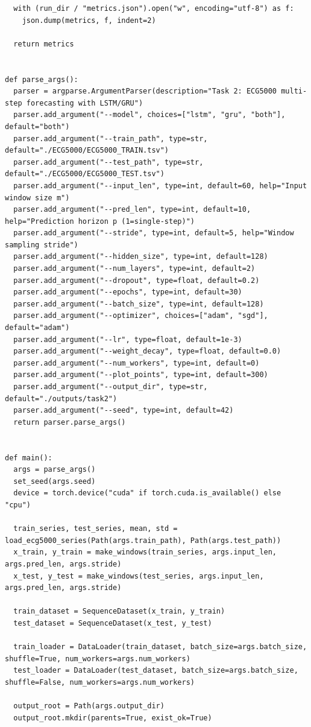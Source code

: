 \documentclass[12pt,a4paper]{ctexart}
\begin{document}
\begin{lstlisting}
  with (run_dir / "metrics.json").open("w", encoding="utf-8") as f:
    json.dump(metrics, f, indent=2)

  return metrics


def parse_args():
  parser = argparse.ArgumentParser(description="Task 2: ECG5000 multi-step forecasting with LSTM/GRU")
  parser.add_argument("--model", choices=["lstm", "gru", "both"], default="both")
  parser.add_argument("--train_path", type=str, default="./ECG5000/ECG5000_TRAIN.tsv")
  parser.add_argument("--test_path", type=str, default="./ECG5000/ECG5000_TEST.tsv")
  parser.add_argument("--input_len", type=int, default=60, help="Input window size m")
  parser.add_argument("--pred_len", type=int, default=10, help="Prediction horizon p (1=single-step)")
  parser.add_argument("--stride", type=int, default=5, help="Window sampling stride")
  parser.add_argument("--hidden_size", type=int, default=128)
  parser.add_argument("--num_layers", type=int, default=2)
  parser.add_argument("--dropout", type=float, default=0.2)
  parser.add_argument("--epochs", type=int, default=30)
  parser.add_argument("--batch_size", type=int, default=128)
  parser.add_argument("--optimizer", choices=["adam", "sgd"], default="adam")
  parser.add_argument("--lr", type=float, default=1e-3)
  parser.add_argument("--weight_decay", type=float, default=0.0)
  parser.add_argument("--num_workers", type=int, default=0)
  parser.add_argument("--plot_points", type=int, default=300)
  parser.add_argument("--output_dir", type=str, default="./outputs/task2")
  parser.add_argument("--seed", type=int, default=42)
  return parser.parse_args()


def main():
  args = parse_args()
  set_seed(args.seed)
  device = torch.device("cuda" if torch.cuda.is_available() else "cpu")

  train_series, test_series, mean, std = load_ecg5000_series(Path(args.train_path), Path(args.test_path))
  x_train, y_train = make_windows(train_series, args.input_len, args.pred_len, args.stride)
  x_test, y_test = make_windows(test_series, args.input_len, args.pred_len, args.stride)

  train_dataset = SequenceDataset(x_train, y_train)
  test_dataset = SequenceDataset(x_test, y_test)

  train_loader = DataLoader(train_dataset, batch_size=args.batch_size, shuffle=True, num_workers=args.num_workers)
  test_loader = DataLoader(test_dataset, batch_size=args.batch_size, shuffle=False, num_workers=args.num_workers)

  output_root = Path(args.output_dir)
  output_root.mkdir(parents=True, exist_ok=True)


\end{lstlisting}
\end{document}
